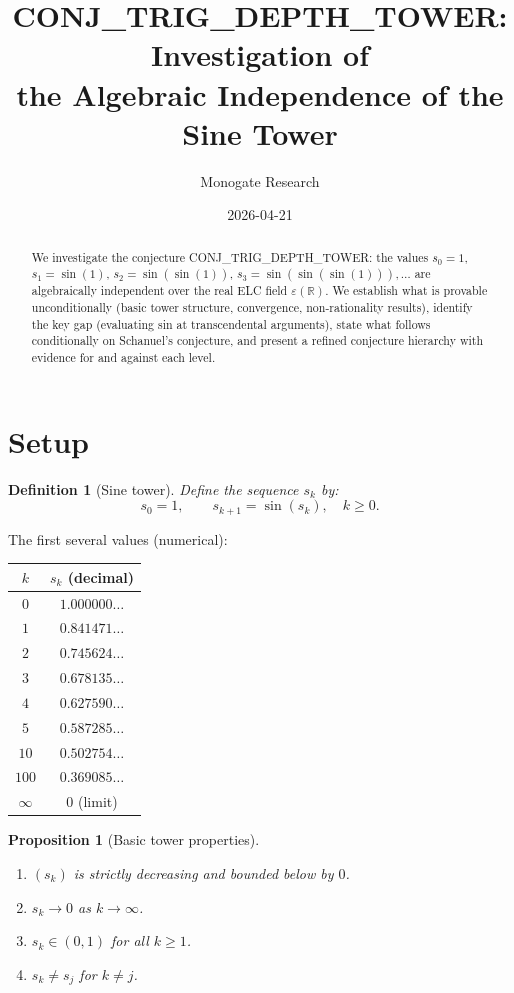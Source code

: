 \documentclass[11pt]{article}
\title{CONJ\_TRIG\_DEPTH\_TOWER: Investigation of\\
the Algebraic Independence of the Sine Tower}
\author{Monogate Research}
\date{2026-04-21}
\newtheorem{proposition}[theorem]{Proposition}
\newtheorem{definition}[theorem]{Definition}
\begin{document}
\maketitle

\begin{abstract}
We investigate the conjecture CONJ\_TRIG\_DEPTH\_TOWER: the values
$s_0=1$, $s_1=\sin(1)$, $s_2=\sin(\sin(1))$, $s_3=\sin(\sin(\sin(1))),\ldots$
are algebraically independent over the real ELC field $\varepsilon(\mathbb{R})$.
We establish what is provable unconditionally (basic tower structure, convergence,
non-rationality results), identify the key gap (evaluating sin at transcendental arguments),
state what follows conditionally on Schanuel's conjecture,
and present a refined conjecture hierarchy with evidence for and against each level.
\end{abstract}

\section{Setup}

\begin{definition}[Sine tower]
Define the sequence $s_k$ by:
\[
s_0 = 1, \qquad s_{k+1} = \sin(s_k), \quad k \geq 0.
\]
\end{definition}

The first several values (numerical):
\begin{center}
\begin{tabular}{cc}
\toprule
$k$ & $s_k$ (decimal) \\
\midrule
$0$ & $1.000000\ldots$ \\
$1$ & $0.841471\ldots$ \\
$2$ & $0.745624\ldots$ \\
$3$ & $0.678135\ldots$ \\
$4$ & $0.627590\ldots$ \\
$5$ & $0.587285\ldots$ \\
$10$ & $0.502754\ldots$ \\
$100$ & $0.369085\ldots$ \\
$\infty$ & $0$ (limit) \\
\bottomrule
\end{tabular}
\end{center}

\begin{proposition}[Basic tower properties]
\label{prop:basic}
\begin{enumerate}
  \item $(s_k)$ is strictly decreasing and bounded below by $0$.
  \item $s_k\to0$ as $k\to\infty$.
  \item $s_k\in(0,1)$ for all $k\geq1$.
  \item $s_k\neq s_j$ for $k\neq j$.
\end{enumerate}
\end{proposition}
\end{document}
